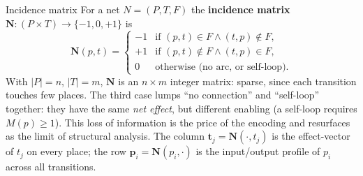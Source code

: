 \begin{definitionbox}{Incidence matrix}
For a net $N = (P, T, F)$ the \textbf{incidence matrix} $\mathbf{N} : (P \times T) \to \{-1, 0, +1\}$ is
\[
\mathbf{N}(p, t) = \begin{cases}
 -1 & \text{if } (p, t) \in F \wedge (t, p) \notin F, \\
 +1 & \text{if } (p, t) \notin F \wedge (t, p) \in F, \\
  0 & \text{otherwise (no arc, or self-loop).}
\end{cases}
\]
With $|P| = n$, $|T| = m$, $\mathbf{N}$ is an $n \times m$ integer matrix: sparse, since each transition touches few places. The third case lumps ``no connection'' and ``self-loop'' together: they have the same \emph{net effect}, but different enabling (a self-loop requires $M(p) \geq 1$). This loss of information is the price of the encoding and resurfaces as the limit of structural analysis. The column $\mathbf{t}_j = \mathbf{N}(\cdot, t_j)$ is the effect-vector of $t_j$ on every place; the row $\mathbf{p}_i = \mathbf{N}(p_i, \cdot)$ is the input/output profile of $p_i$ across all transitions.
\end{definitionbox}


